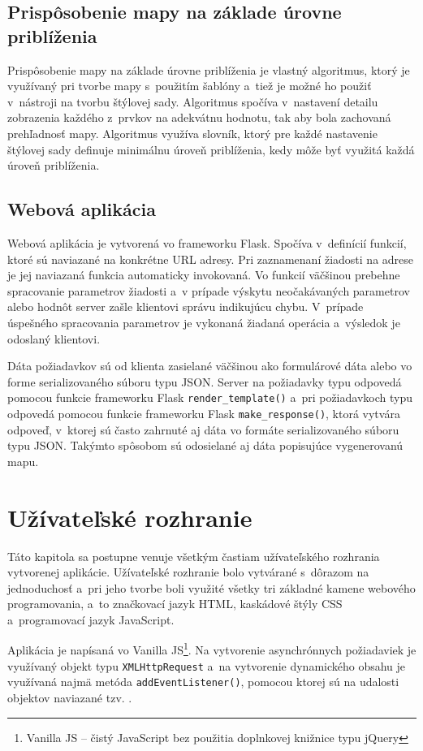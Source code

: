 \section{Prispôsobenie mapy na základe úrovne priblíženia}
\label{adjust_to_zoom}
Prispôsobenie mapy na základe úrovne priblíženia je vlastný algoritmus, ktorý je využívaný pri tvorbe mapy s~použitím šablóny a~tiež je možné ho použiť v~nástroji na tvorbu štýlovej sady. Algoritmus spočíva v~nastavení detailu zobrazenia každého z~prvkov na adekvátnu hodnotu, tak aby bola zachovaná prehľadnosť mapy. Algoritmus využíva slovník, ktorý pre každé nastavenie štýlovej sady definuje minimálnu úroveň priblíženia, kedy môže byť využitá každá úroveň priblíženia.

\section{Webová aplikácia}
\label{app}
Webová aplikácia je vytvorená vo frameworku Flask. Spočíva v~definícií funkcií, ktoré sú naviazané na konkrétne URL adresy. Pri zaznamenaní žiadosti na adrese je jej naviazaná funkcia automaticky invokovaná. Vo funkcií väčšinou prebehne spracovanie parametrov žiadosti a~v prípade výskytu neočakávaných parametrov alebo hodnôt server zašle klientovi správu indikujúcu chybu. V~prípade úspešného spracovania parametrov je vykonaná žiadaná operácia a~výsledok je odoslaný klientovi. 

Dáta požiadavkov sú od klienta zasielané väčšinou ako formulárové dáta alebo vo forme serializovaného súboru typu JSON. Server na požiadavky typu  odpovedá pomocou funkcie frameworku Flask {\tt render\_template()} a~pri požiadavkoch typu  odpovedá pomocou funkcie frameworku Flask {\tt make\_response()}, ktorá vytvára odpoveď, v~ktorej sú často zahrnuté aj dáta vo formáte serializovaného súboru typu JSON. Takýmto spôsobom sú odosielané aj dáta popisujúce vygenerovanú mapu.


\chapter{Užívateľské rozhranie}
\label{interface}
Táto kapitola sa postupne venuje všetkým častiam užívateľského rozhrania vytvorenej aplikácie. Užívateľské rozhranie bolo vytvárané s~dôrazom na jednoduchosť a~pri jeho tvorbe boli využité všetky tri základné kamene webového programovania, a~to značkovací jazyk HTML, kaskádové štýly CSS a~programovací jazyk JavaScript. 

Aplikácia je napísaná vo Vanilla JS\footnote{Vanilla JS -- čistý JavaScript bez použitia doplnkovej knižnice typu jQuery}. Na vytvorenie asynchrónnych požiadaviek je využívaný objekt typu {\tt XMLHttpRequest} a~na vytvorenie dynamického obsahu je využívaná najmä metóda {\tt addEventListener()}, pomocou ktorej sú na udalosti objektov naviazané tzv. .

